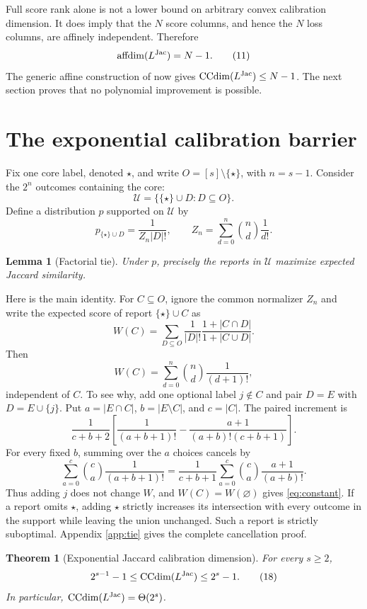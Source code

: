 \documentclass{article}
\newtheorem{theorem}{Theorem}
\newtheorem{lemma}{Lemma}
\newcommand{\1}{\mathbf 1}
\newcommand{\CCdim}{\operatorname{CCdim}}
\newcommand{\affdim}{\operatorname{affdim}}
\begin{document}
Full score rank alone is not a lower bound on arbitrary convex calibration dimension. It does imply that the $N$ score columns, and hence the $N$ loss columns, are affinely independent. Therefore \[ \affdim(L^{\rm Jac})=N-1. \tag{11}\label{eq:affdim} \] The generic affine construction of \citet{ramaswamy2016ccdim} now gives $\CCdim(L^{\rm Jac})\leq N-1$. The next section proves that no polynomial improvement is possible.

\section{The exponential calibration barrier}
\label{sec:barrier}

Fix one core label, denoted $\star$, and write $O=[s]\setminus\{\star\}$, with $n=s-1$. Consider the $2^n$ outcomes containing the core: \[ \mathcal U=\{\{\star\}\cup D:D\subseteq O\}. \tag{12}\label{eq:U} \] Define a distribution $p$ supported on $\mathcal U$ by \[ p_{\{\star\}\cup D} =\frac{1}{Z_n|D|!}, \qquad Z_n=\sum_{d=0}^n\binom nd\frac1{d!}. \tag{13}\label{eq:witness} \]

\begin{lemma}[Factorial tie]
\label{lem:tie}
Under $p$, precisely the reports in $\mathcal U$ maximize expected Jaccard similarity.
\end{lemma}

Here is the main identity. For $C\subseteq O$, ignore the common normalizer $Z_n$ and write the expected score of report $\{\star\}\cup C$ as \[ W(C)=\sum_{D\subseteq O}\frac1{|D|!} \frac{1+|C\cap D|}{1+|C\cup D|}. \tag{14}\label{eq:W} \] Then \[ W(C)=\sum_{d=0}^n\binom nd\frac1{(d+1)!}, \tag{15}\label{eq:constant} \] independent of $C$. To see why, add one optional label $j\notin C$ and pair $D=E$ with $D=E\cup\{j\}$. Put $a=|E\cap C|$, $b=|E\setminus C|$, and $c=|C|$. The paired increment is \[ \frac1{c+b+2} \left[ \frac1{(a+b+1)!} -\frac{a+1}{(a+b)!(c+b+1)} \right]. \tag{16}\label{eq:increment} \] For every fixed $b$, summing over the $a$ choices cancels by \[ \sum_{a=0}^c\binom ca\frac1{(a+b+1)!} =\frac1{c+b+1}\sum_{a=0}^c \binom ca\frac{a+1}{(a+b)!}. \tag{17}\label{eq:identity} \] Thus adding $j$ does not change $W$, and $W(C)=W(\varnothing)$ gives \eqref{eq:constant}. If a report omits $\star$, adding $\star$ strictly increases its intersection with every outcome in the support while leaving the union unchanged. Such a report is strictly suboptimal. Appendix \ref{app:tie} gives the complete cancellation proof.

\begin{theorem}[Exponential Jaccard calibration dimension]
\label{thm:main}
For every $s\geq2$, \[ 2^{s-1}-1\leq\CCdim(L^{\rm Jac})\leq2^s-1. \tag{18}\label{eq:main} \] In particular, $\CCdim(L^{\rm Jac})=\Theta(2^s)$.
\end{theorem}
\end{document}
